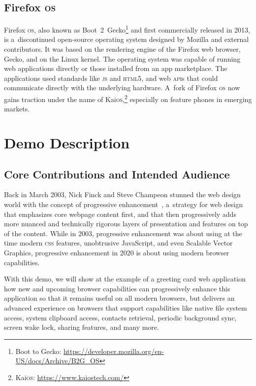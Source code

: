 \documentclass[sigconf]{acmart}
\begin{document}
\subsection{Firefox \textsc{os}}

Firefox \textsc{os}, also known as
Boot~2~Gecko\footnote{Boot to Gecko: \url{https://developer.mozilla.org/en-US/docs/Archive/B2G_OS}}
and first commercially released in 2013,
is a~discontinued open-source operating system
designed by Mozilla and external contributors.
It was based on the rendering engine of the Firefox web browser, Gecko,
and on the Linux kernel.
The operating system was capable of running web applications directly
or those installed from an app marketplace.
The applications used standards like \textsc{js} and \textsc{html}5,
and web \textsc{api}s that could communicate directly with the underlying hardware.
A~fork of Firefox \textsc{os} now gains traction under the name of
Kai\textsc{os},\footnote{Kai\textsc{os}: \url{https://www.kaiostech.com/}}
especially on feature phones in emerging markets.

\section{Demo Description}

\subsection{Core Contributions and Intended Audience}

Back in March 2003, Nick Finck and Steve Champeon stunned the web design world
with the concept of progressive enhancement~\cite{champeon03},
a~strategy for web design that emphasizes core webpage content first,
and that then progressively adds more nuanced and technically rigorous layers
of presentation and features on top of the content.
While in 2003, progressive enhancement was about using at the time modern \textsc{css} features,
unobtrusive JavaScript, and even Scalable Vector Graphics,
progressive enhancement in 2020 is about using modern browser capabilities.

With this demo, we will show at the example of a greeting card web application
how new and upcoming browser capabilities can progressively enhance
this application so that it remains useful on all modern browsers,
but delivers an advanced experience on browsers that support capabilities
like native file system access, system clipboard access, contacts retrieval,
periodic background sync, screen wake lock, sharing features, and many more.
\end{document}
